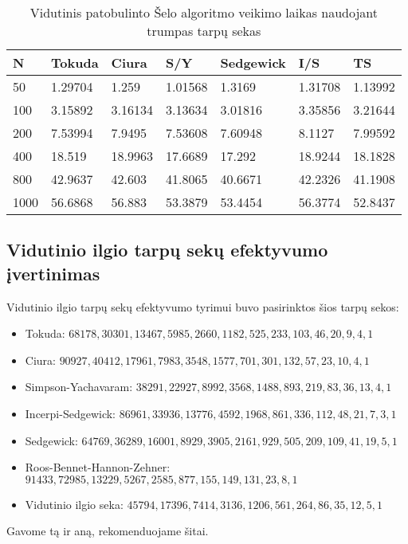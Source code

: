 \documentclass{VUMIFInfKursinis}
\begin{document}
\begin{table}[H]
  \caption{Vidutinis patobulinto Šelo algoritmo veikimo laikas naudojant trumpas tarpų sekas}
  \begin{tabular}{|l|l|l|l|l|l|l|}
  \hline
  N    & Tokuda  & Ciura   & S/Y     & Sedgewick & I/S     & TS      \\ \hline
  50   & 1.29704 & 1.259   & 1.01568 & 1.3169    & 1.31708 & 1.13992 \\ \hline
  100  & 3.15892 & 3.16134 & 3.13634 & 3.01816   & 3.35856 & 3.21644 \\ \hline
  200  & 7.53994 & 7.9495  & 7.53608 & 7.60948   & 8.1127  & 7.99592 \\ \hline
  400  & 18.519  & 18.9963 & 17.6689 & 17.292    & 18.9244 & 18.1828 \\ \hline
  800  & 42.9637 & 42.603  & 41.8065 & 40.6671   & 42.2326 & 41.1908 \\ \hline
  1000 & 56.6868 & 56.883  & 53.3879 & 53.4454   & 56.3774 & 52.8437 \\ \hline
  \end{tabular}
\end{table}

\subsection{Vidutinio ilgio tarpų sekų efektyvumo įvertinimas}

Vidutinio ilgio tarpų sekų efektyvumo tyrimui buvo pasirinktos šios tarpų sekos:
\begin{itemize}
  \item Tokuda: $68178,30301,13467,5985,2660,1182,525,233,103,46,20,9,4,1$
  \item Ciura: $90927,40412,17961,7983,3548,1577,701,301,132,57,23,10,4,1$
  \item Simpson-Yachavaram: $38291,22927,8992,3568,1488,893,219,83,36,13,4,1$
  \item Incerpi-Sedgewick: $86961,33936,13776,4592,1968,861,336,112,48,21,7,3,1$
  \item Sedgewick: $64769,36289,16001,8929,3905,2161,929,505,209,109,41,19,5,1$
  \item Roos-Bennet-Hannon-Zehner: $91433,72985,13229,5267,2585,877,155,149,131,23,8,1$
  \item Vidutinio ilgio seka: $45794,17396,7414,3136,1206,561,264,86,35,12,5,1$
\end{itemize}

Gavome tą ir aną, rekomenduojame šitai.
\end{document}
